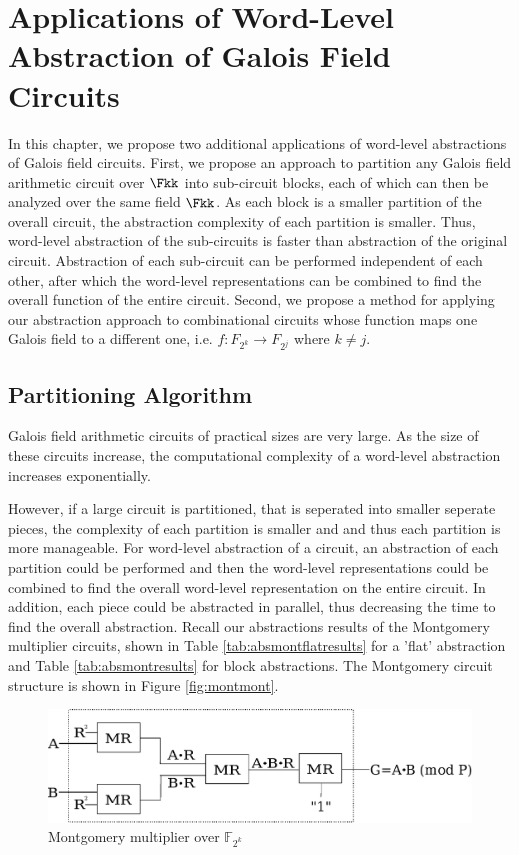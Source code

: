 \chapter{Applications of Word-Level Abstraction of Galois Field 
Circuits}
\label{ch:prop}

In this chapter, we propose two additional applications of word-level 
abstractions
of Galois field circuits. First, we propose an approach to partition
any Galois field arithmetic circuit over $\Fkk$ into sub-circuit  
blocks, each of which can then be analyzed over the same field $\Fkk$.
As each block is a smaller partition of the overall circuit, the 
abstraction complexity of each partition is smaller. Thus, 
word-level abstraction
of the sub-circuits is faster than abstraction of the original circuit.
Abstraction of each sub-circuit can be performed independent of each other,
after which the word-level representations can be combined to find the 
overall function of the entire circuit.
Second, we propose a method for applying our abstraction approach to 
combinational circuits whose function maps one Galois field to 
a different one,
i.e. $f:F_{2^k} \rightarrow F_{2^j}$ where $k \neq j$.

\section{Partitioning Algorithm}
Galois field arithmetic circuits of practical sizes are very large.
As the size of these circuits increase, the computational complexity of a
word-level abstraction increases exponentially.

However, if a large circuit is partitioned, that is 
seperated into smaller seperate pieces, the complexity of each partition is 
smaller and and thus each partition is more manageable.
For word-level abstraction of a circuit, an abstraction of each partition
could be performed and then the word-level representations could be combined
to find the overall word-level representation on the entire circuit.
In addition, each piece
could be abstracted in parallel, thus decreasing the time to
find the overall abstraction.
Recall our abstractions results of the Montgomery multiplier circuits, shown
in Table \ref{tab:absmontflatresults} for a 'flat' abstraction
and Table \ref{tab:absmontresults} for block abstractions. The Montgomery
circuit structure is shown in Figure \ref{fig:montmont}.

\begin{figure}[H]
	\begin{center}
	\includegraphics[scale=0.50]{figures/mmcircuit}
	\end{center}
	\caption{Montgomery multiplier over $\mathbb{F}_{2^k}$}
	\label{fig:montblock}
\end{figure}

